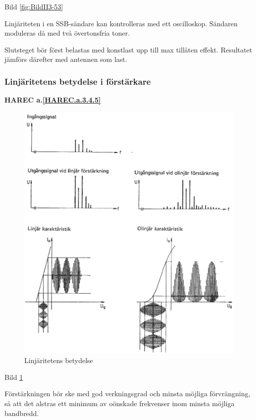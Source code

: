 Bild \ref{fig:BildII3-53}

Linjäriteten i en SSB-sändare kan kontrolleras med ett
oscilloskop. Sändaren moduleras då med två övertonsfria toner.

Slutsteget bör först belastas med konstlast upp till max tillåten
effekt. Resultatet jämförs därefter med antennen som last.

\subsubsection{Linjäritetens betydelse i förstärkare}
\textbf{HAREC a.\ref{HAREC.a.3.4.5}\label{myHAREC.a.3.4.5}}

\begin{figure}
\includegraphics[width=\textwidth]{images/cropped_pdfs/bild_2_3-54.pdf}
\caption{Linjäritetens betydelse}
\label{fig:BildII3-54}
\end{figure}

Bild \ref{fig:BildII3-54}

Förstärkningen bör ske med god verkningsgrad och minsta möjliga
förvrängning, så att det alstras ett minimum av oönskade frekvenser
inom minsta möjliga bandbredd.

